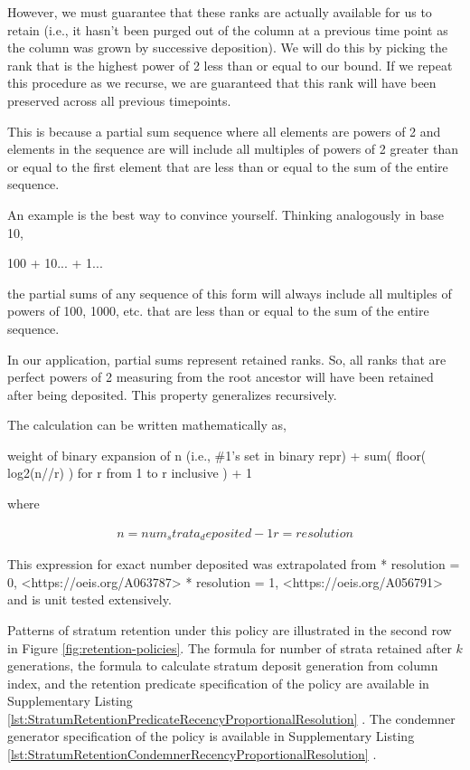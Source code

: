 However, we must guarantee that these ranks are actually available for
us to retain (i.e., it hasn't been purged out of the column at a
previous time point as the column was grown by successive deposition).
We will do this by picking the rank that is the highest power of 2
less than or equal to our bound. If we repeat this procedure as we
recurse, we are guaranteed that this rank will have been preserved
across all previous timepoints.

This is because a partial sum sequence where all elements are powers
of 2 and elements in the sequence are will include all multiples of
powers of 2 greater than or equal to the first element that are less
than or equal to the sum of the entire
sequence.

An example is the best way to convince yourself. Thinking analogously
in base 10,

   100 + 10... + 1...

the partial sums of any sequence of this form will always include all
multiples of powers of 100, 1000, etc. that are less than or equal to
the sum of the entire sequence.

In our application, partial sums represent retained ranks. So, all
ranks that are perfect powers of 2 measuring from the root ancestor
will have been retained after being deposited. This property
generalizes recursively.

The calculation can be written mathematically as,

  weight of binary expansion of n (i.e., \#1's set in binary repr)
  + sum(
      floor( log2(n//r) )
      for r from 1 to r inclusive
  )
  + 1

where

\begin{align*}
  n = num_strata_deposited - 1
  r = resolution
\end{align*}

This expression for exact number deposited was extrapolated from
    * resolution = 0, <https://oeis.org/A063787> \citep{sloane2021a063787}
    * resolution = 1, <https://oeis.org/A056791> \citep{sloane2021a056791}
and is unit tested extensively.

Patterns of stratum retention under this policy are illustrated in the second row in Figure \ref{fig:retention-policies}.
The formula for number of strata retained after $k$ generations, the formula to calculate stratum deposit generation from column index, and the retention predicate specification of the policy are available in Supplementary Listing \ref{lst:StratumRetentionPredicateRecencyProportionalResolution} \citep{moreno2022hstratconceptsupplement}.
The condemner generator specification of the policy is available in Supplementary Listing \ref{lst:StratumRetentionCondemnerRecencyProportionalResolution} \citep{moreno2022hstratconceptsupplement}.


